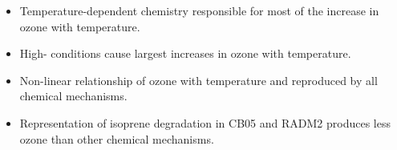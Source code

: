 \begin{BlueBox}
    \vskip-1cm
    \begin{block}{}
        \vspace{9mm}
        \begin{itemize}
            \item Temperature-dependent chemistry responsible for most of the increase in ozone with temperature. \vspace{20mm}
            \item High- conditions cause largest increases in ozone with temperature. \vspace{20mm}
            \item Non-linear relationship of ozone with temperature and  reproduced by all chemical mechanisms. \vspace{20mm}
            \item Representation of isoprene degradation in CB05 and RADM2 produces less ozone than other chemical mechanisms. \vspace{20mm}
        \end{itemize}        
    \end{block}
\end{BlueBox}
